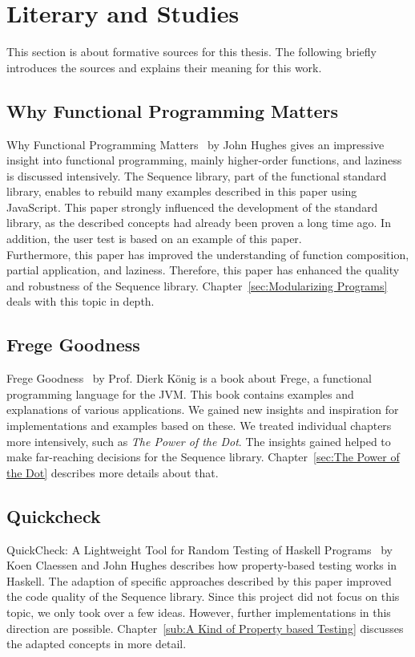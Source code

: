 \section{Literary and Studies}
\label{sec:Literary and Studies}
This section is about formative sources for this thesis. The following briefly
introduces the sources and explains their meaning for this work.

\subsection{Why Functional Programming Matters}
\label{sub:Functional Programming Matters}

Why Functional Programming Matters~\cite{hughes_why_1989} by John Hughes gives
an impressive insight into functional programming, mainly higher-order
functions, and laziness is discussed intensively. The Sequence library, part of
the functional standard library, enables to rebuild many examples described in
this paper using JavaScript. This paper strongly influenced the development of
the standard library, as the described concepts had already been proven a long
time ago. In addition, the user test is based on an example of this paper. \\
Furthermore, this paper has improved the understanding of function composition,
partial application, and laziness. Therefore, this paper has enhanced the
quality and robustness of the Sequence library. Chapter~\ref{sec:Modularizing
Programs} deals with this topic in depth.

\subsection{Frege Goodness}
\label{sub:Frege Goodness}
Frege Goodness~\cite{frege_goodness} by Prof. Dierk König is a book about
Frege, a functional programming language for the JVM. This book contains
examples and explanations of various applications. We gained new insights and
inspiration for implementations and examples based on these. We treated
individual chapters more intensively, such as \textit{The Power of the Dot}.
The insights gained helped to make far-reaching decisions for the Sequence
library. Chapter~\ref{sec:The Power of the Dot} describes more details about
that.

\subsection{Quickcheck}
\label{sub:Quickcheck}
QuickCheck: A Lightweight Tool for Random Testing of Haskell
Programs~\cite{quickcheck_hughes} by Koen Claessen and John Hughes describes
how property-based testing works in Haskell. The adaption of specific
approaches described by this paper improved the code quality of the Sequence
library. Since this project did not focus on this topic, we only took over a few
ideas. However, further implementations in this direction are possible.
Chapter~\ref{sub:A Kind of Property based Testing} discusses the adapted
concepts in more detail. 

